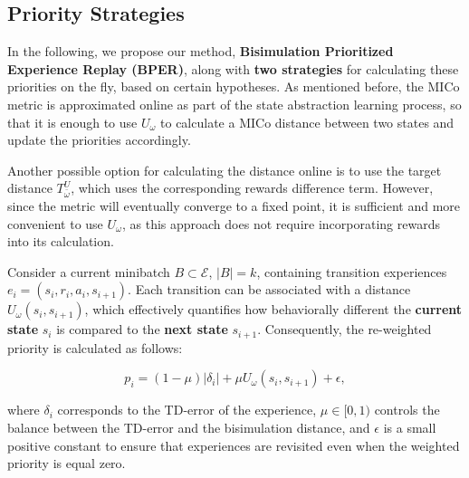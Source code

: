 
\subsection{Priority Strategies}


In the following, we propose our method, \textbf{Bisimulation Prioritized Experience Replay (BPER)}, along with \textbf{two strategies} for calculating these priorities on the fly, based on certain hypotheses. As mentioned before, the MICo metric is approximated online as part of the state abstraction learning process, so that it is enough to use $U_\omega$ to calculate a MICo distance between two states and update the priorities accordingly.

Another possible option for calculating the distance online is to use the target distance \(T^U_{\bar{\omega}}\), which uses the corresponding rewards difference term. However, since the metric will eventually converge to a fixed point, it is sufficient and more convenient to use \(U_\omega\), as this approach does not require incorporating rewards into its calculation.


\begin{strategy}
Consider a current minibatch \(B \subset \mathcal{E}\), $|B| = k$, containing transition experiences \(e_i = (s_i, r_i, a_i, s_{i+1})\). Each transition can be associated with a distance \(U_\omega(s_i, s_{i+1})\), which effectively quantifies how behaviorally different the \textbf{current state} \(s_i\) is compared to the \textbf{next state} \(s_{i+1}\). Consequently, the re-weighted priority is calculated as follows:

\begin{equation}
    p_i = (1 - \mu) |\delta_i| + \mu U_\omega(s_i, s_{i+1}) + \epsilon,
\end{equation}

where \(\delta_i\) corresponds to the TD-error of the experience, \(\mu \in [0,1)\) controls the balance between the TD-error and the bisimulation distance, and \(\epsilon\) is a small positive constant to ensure that experiences are revisited even when the weighted priority is equal zero.
\end{strategy}


